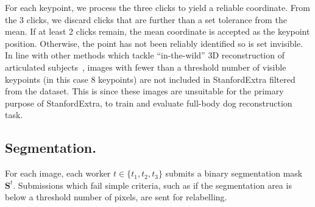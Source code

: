 For each keypoint, we process the three clicks to yield a reliable coordinate. From the 3 clicks, we discard clicks that are further than a set tolerance from the mean. If at least 2 clicks remain, the mean coordinate is accepted as the keypoint position. Otherwise, the point has not been reliably identified so is set invisible. In line with other methods which tackle ``in-the-wild'' 3D reconstruction of articulated subjects~\cite{kolotouros19learning,kolotouros19convolutional}, images with fewer than a threshold number of visible keypoints (in this case 8 keypoints) are not included in StanfordExtra filtered from the dataset. This is since these images are unsuitable for the primary purpose of StanfordExtra, to train and evaluate full-body dog reconstruction task. 








\subsection{Segmentation.}

\def\turker{t}
\def\turkertwo{t'}
\def\turkerboth{\bar{t}}

For each image, each worker $\turker \in \{\turker_{1}, \turker_{2}, \turker_{3}\}$ submits a binary segmentation mask $\mathbf{S}^{\turker}$. Submissions which fail simple criteria, such as if the segmentation area is below a threshold number of pixels, are sent for relabelling. 

